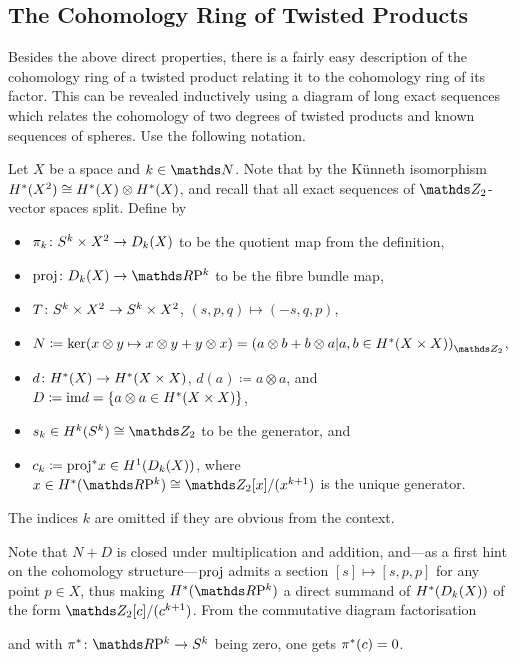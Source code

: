 \subsection{The Cohomology Ring of Twisted Products}
Besides the above direct properties, there is a fairly easy
description of the cohomology ring of a twisted product relating it to
the cohomology ring of its factor.
This can be revealed inductively using a diagram of long exact
sequences which relates the cohomology of two degrees of twisted
products and known sequences of spheres.
Use the following notation.

\begin{Def}
  Let $X$ be a space and $k\in\Nat$.
  Note that by the Künneth isomorphism
  $H^*(X^2)\cong H^*(X)\otimes H^*(X)$, and recall that all exact
  sequences of $\Zmod2$-vector spaces split.
  Define by
  \begin{itemize}
  \item
    $\pi_k\colon S^{k}\times X^2\to D_{k}({X})$
    to be the quotient map from the definition,
  \item
    $\proj\colon\Twistedprod k X\to \RP k$
    to be the fibre bundle map,
  \item
    $T\colon S^{k}\times X^2\to S^{k}\times X^2$,
    $(s,p,q)\mapsto(-s,q,p)$,
  \item
    $N\coloneqq
    \ker(x\otimes y\mapsto x\otimes y + y\otimes x)
    = \left(
        a\otimes b + b\otimes a
        \middle|
        a,b\in \H^*(X\times X)
      \right)_{\Zmod2}$,
  \item
    $d\colon H^*(X)\to H^*(X\times X)$,
    $d(a)\coloneqq a\otimes a$, and
    $D\coloneqq \mathrm{im} d
    = \left\{ a\otimes a \in H^*(X\times X) \right\}$,
  \item
    $s_k\in\H^k(\Sphere k)\cong\Zmod2$ to be the generator, and
  \item
    $c_k\coloneqq {\mathrm{proj}}^* x\in H^1(D_{k}({X}))$, where
    $x\in\H^*(\RP k)\cong\Zmod2[x]/(x^{k+1})$ is the unique generator.
  \end{itemize}
  The indices $k$ are omitted if they are obvious from the context.
\end{Def}
\begin{Rem}
  Note that $N+D$ is closed under multiplication and addition,
  and---as a first hint on the cohomology structure---$\mathrm{proj}$ admits a
  section  $[s]\mapsto[s,p,p]$ for any point $p\in X$, thus making
  $\H^*(\RP k)$ a direct summand of $H^*(D_{k}({X}))$ of the
  form $\Zmod2[c]/(c^{k+1})$.
  From the commutative diagram factorisation
  \begin{center}
  \end{center}
  and with $\pb\pi\colon\RP k\to\Sphere k$ being zero, one gets ${\pi}^*(c)=0$.
\end{Rem}
